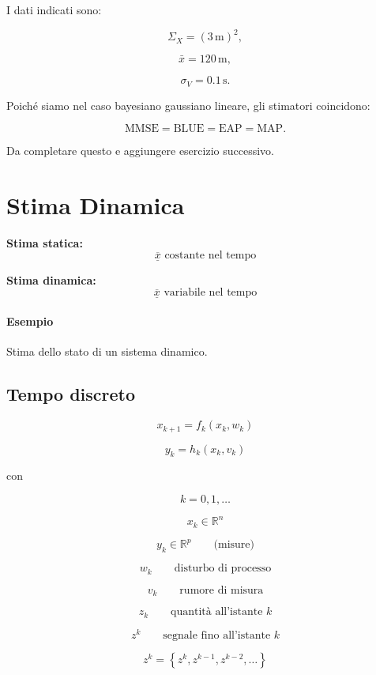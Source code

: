 \documentclass[11pt,a4paper]{article}
\begin{document}
I dati indicati sono:

\[
\Sigma_X=(3\,\mathrm{m})^2,
\]

\[
\bar x=120\,\mathrm{m},
\]

\[
\sigma_V=0.1\,\mathrm{s}.
\]

Poiché siamo nel caso bayesiano gaussiano lineare, gli stimatori coincidono:

\[
\mathrm{MMSE}
=
\mathrm{BLUE}
=
\mathrm{EAP}
=
\mathrm{MAP}.
\]

Da completare questo e aggiungere esercizio successivo.

\section{Stima Dinamica}

\textbf{Stima statica:}
\[
\overline{\underline{x}} \text{ costante nel tempo}
\]

\textbf{Stima dinamica:}
\[
\overline{\underline{x}} \text{ variabile nel tempo}
\]

\paragraph{Esempio}
Stima dello stato di un sistema dinamico.

\subsection*{Tempo discreto}

\[
x_{k+1}=f_k(x_k,w_k)
\]

\[
y_k=h_k(x_k,v_k)
\]

con

\[
k=0,1,\ldots
\]

\[
x_k\in\mathbb{R}^{n}
\]

\[
y_k\in\mathbb{R}^{p}
\qquad \text{(misure)}
\]

\[
w_k
\qquad \text{disturbo di processo}
\]

\[
v_k
\qquad \text{rumore di misura}
\]

\vspace{0.5cm}

\[
z_k
\qquad \text{quantità all'istante }k
\]

\[
z^{k}
\qquad \text{segnale fino all'istante }k
\]

\[
z^{k}=
\left\{
z^{k},
z^{k-1},
z^{k-2},
\ldots
\right\}
\]

\vspace{0.5cm}
\end{document}
